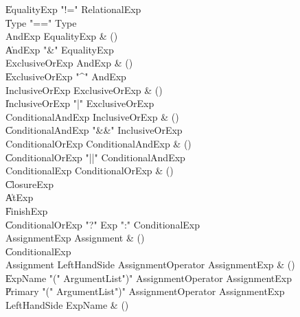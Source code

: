 \begin{bbgrammar}

    \| EqualityExp \xcd"!=" RelationalExp\\
    \| Type  \xcd"==" Type \\
 AndExp  \label{prod:AndExp}  \: EqualityExp & ()\\
    \| AndExp \xcd"&" EqualityExp\\
 ExclusiveOrExp  \label{prod:ExclusiveOrExp}  \: AndExp & ()\\
    \| ExclusiveOrExp \xcd"^" AndExp\\
 InclusiveOrExp  \label{prod:InclusiveOrExp}  \: ExclusiveOrExp & ()\\
    \| InclusiveOrExp \xcd"|" ExclusiveOrExp\\
 ConditionalAndExp  \label{prod:ConditionalAndExp}  \: InclusiveOrExp & ()\\
    \| ConditionalAndExp \xcd"&&" InclusiveOrExp\\
 ConditionalOrExp  \label{prod:ConditionalOrExp}  \: ConditionalAndExp & ()\\
    \| ConditionalOrExp \xcd"||" ConditionalAndExp\\
 ConditionalExp  \label{prod:ConditionalExp}  \: ConditionalOrExp & ()\\
    \| ClosureExp\\
    \| AtExp\\
    \| FinishExp\\
    \| ConditionalOrExp \xcd"?" Exp \xcd":" ConditionalExp\\
 AssignmentExp  \label{prod:AssignmentExp}  \: Assignment & ()\\
    \| ConditionalExp\\
 Assignment  \label{prod:Assignment}  \: LeftHandSide AssignmentOperator AssignmentExp & ()\\
    \| ExpName  \xcd"(" ArgumentList\opt \xcd")" AssignmentOperator AssignmentExp\\
    \| Primary  \xcd"(" ArgumentList\opt \xcd")" AssignmentOperator AssignmentExp\\
 LeftHandSide  \label{prod:LeftHandSide}  \: ExpName & ()\\

\end{bbgrammar}

